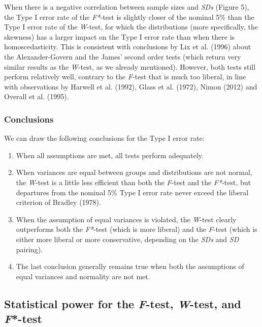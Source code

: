 \documentclass[man,floatsintext]{apa6}
\providecommand{\tightlist}{%
  \setlength{\itemsep}{0pt}\setlength{\parskip}{0pt}}
\begin{document}
When there is a negative correlation between sample sizes and \emph{SDs} (Figure 5), the Type I error rate of the \emph{F*}-test is slightly closer of the nominal 5\% than the Type I error rate of the \emph{W}-test, for which the distributions (more specifically, the skewness) has a larger impact on the Type I error rate than when there is homoscedasticity. This is consistent with conclusions by Lix et al. (1996) about the Alexander-Govern and the James' second order tests (which return very similar results as the \emph{W}-test, as we already mentioned). However, both tests still perform relatively well, contrary to the \emph{F}-test that is much too liberal, in line with observations by Harwell et al. (1992), Glass et al. (1972), Nimon (2012) and Overall et al. (1995).

\hypertarget{conclusions}{%
\subsubsection{Conclusions}\label{conclusions}}

We can draw the following conclusions for the Type I error rate:

\begin{enumerate}
\def\labelenumi{\arabic{enumi})}
\tightlist
\item
  When all assumptions are met, all tests perform adequately.\\
\item
  When variances are equal between groups and distributions are not normal, the \emph{W}-test is a little less efficient than both the \emph{F}-test and the \emph{F*}-test, but departures from the nominal 5\% Type I error rate never exceed the liberal criterion of Bradley (1978).\\
\item
  When the assumption of equal variances is violated, the \emph{W}-test clearly outperforms both the \emph{F*}-test (which is more liberal) and the \emph{F}-test (which is either more liberal or more conservative, depending on the \emph{SDs} and \emph{SD} pairing).\\
\item
  The last conclusion generally remains true when both the assumptions of equal variances and normality are not met.
\end{enumerate}

\hypertarget{statistical-power-for-the-f-test-w-test-and-f-test}{%
\subsection{\texorpdfstring{Statistical power for the \emph{F}-test, \emph{W}-test, and \emph{F}*-test}{Statistical power for the F-test, W-test, and F*-test}}\label{statistical-power-for-the-f-test-w-test-and-f-test}}
\end{document}
